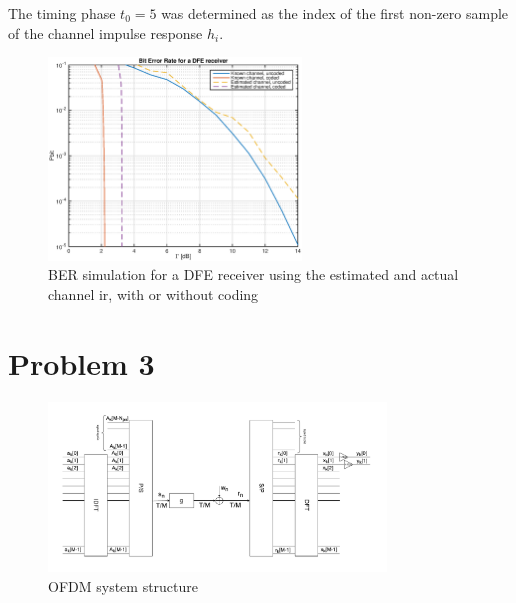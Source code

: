 \documentclass[10pt]{article}
\begin{document}
The timing phase $t_0 = 5$ was determined as the index of the first non-zero sample of the channel impulse response ${h_i}$.




\begin{figure}
	\centering
	\includegraphics[width = 0.6\textwidth]{problem2}
	\caption{BER simulation for a DFE receiver using the estimated and actual channel ir, with or without coding}
	\label{fig:problem2_pbit}
\end{figure}

\section*{Problem 3}

\begin{figure}
	\centering
	\includegraphics[width = 0.8\textwidth]{OFDM}
	\caption{OFDM system structure}
	\label{fig:OFDM}
\end{figure}
\end{document}
